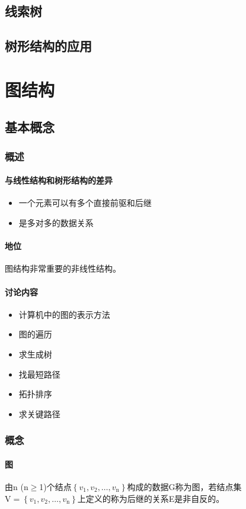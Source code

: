 \documentclass[AutoFakeBold]{LZUThesis2007}
\begin{document}
	\section{线索树}
	\section{树形结构的应用}

\chapter{图结构}
	\section{基本概念}
		\subsection{概述}
			\subsubsection{与线性结构和树形结构的差异}
				\begin{itemize}
					\item 一个元素可以有多个直接前驱和后继
					\item 是多对多的数据关系
				\end{itemize}
			\subsubsection{地位}
		
				图结构非常重要的非线性结构。
			\subsubsection{讨论内容}
				\begin{itemize}
					\item 计算机中的图的表示方法
					\item 图的遍历
					\item 求生成树
					\item 找最短路径
					\item 拓扑排序
					\item 求关键路径
				\end{itemize}
		\subsection{概念}
			\subsubsection{图}
由n (n$\ge$1)个结点$\left\{v_{1}, v_{2}, \dots, v_{\mathrm{n}}\right\}$构成的数据G称为图，若结点集$\mathrm{V}=\left\{v_{1}, v_{2}, \dots, v_{\mathrm{n}}\right\}$上定义的称为后继的关系E是非自反的。
\end{document}
